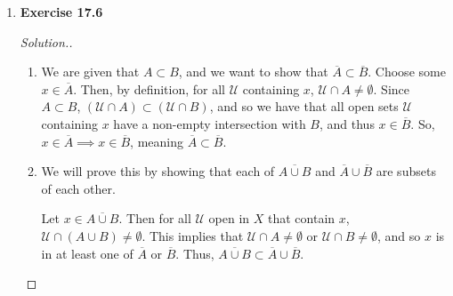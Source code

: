 \documentclass{article}
\newcommand{\U}{\mathcal{U}}
\newcommand{\R}{\mathbb{R}}
\newcommand{\sk}{\smallskip}
\begin{document}
\begin{enumerate}
\begin{proof}[Solution.]
        \sk

        In the case of $\R_\ell \times \R_\ell$, when $L$ is vertical, if it intersects with $[a, b) \times [c, d)$, which is a basis element of $\R_\ell \times \R_\ell$, then it must intersect at the bottom edge, so we have $L \cap (\R_\ell \times \R_\ell) = \{x_0\} \times [c, d)$. Define $f: L \cap (\R_\ell \times \R_\ell) \rightarrow \R_\ell$ as $\{x_0\} \times [c, d) \mapsto [c, d)$. So, $f$ is bijective and maps open sets in $L \cap (\R_\ell \times \R_\ell)$ to open sets in $\R_\ell$, so the topology $L$ inherits is $\R_\ell$.

        \sk

        If $L$ has finite slope, we consider whether the slope is positive or negative. In the case that it is positive, then the intersection of $L \cap (\R_\ell \times \R_\ell)$ will be $(x, mx+e) : x \in [a, b)$, and we have shown in this case that $L$ inherits $\R_\ell$. 

        \sk

        If $L$ has negative slope and intersects $[a, b) \times [c, d)$, then $L$ inherits the discrete topology. Consider $(x, y) \in L$. $L \cap ([x, x + 1) \times [y, y + 1)) = \{(x, y)\}$, so every point on $L$ is open, which is the definition of the discrete topology. 
        
    \end{proof}

    \item
    \textbf{Exercise 17.6}
    \begin{proof}[Solution.]
        \begin{enumerate}
            \item We are given that $A \subset B$, and we want to show that $\overline{A} \subset \overline{B}$. Choose some $x \in \overline{A}$. Then, by definition, for all $\U$ containing $x$, $\U \cap A \neq \emptyset$. Since $A \subset B$, $(\U \cap A) \subset (\U \cap B)$, and so we have that all open sets $\U$ containing $x$ have a non-empty intersection with $B$, and thus $x \in \overline{B}$. So, $x \in \overline{A} \implies x \in \overline{B}$, meaning $\overline{A} \subset \overline{B}$. 

            \item We will prove this by showing that each of $\overline{A \cup B}$ and $\overline{A} \cup \overline{B}$ are subsets of each other. 

            \sk 

            Let $x \in \overline{A \cup B}$. Then for all $\U$ open in $X$ that contain $x$, $\U \cap (A \cup B) \neq \emptyset$. This implies that $\U \cap A \neq \emptyset$ or $\U \cap B \neq \emptyset$, and so $x$ is in at least one of $\overline{A}$ or $\overline{B}$. Thus, $\overline{A \cup B} \subset \overline{A} \cup \overline{B}$.


\end{enumerate}
\end{proof}
\end{enumerate}
\end{document}
